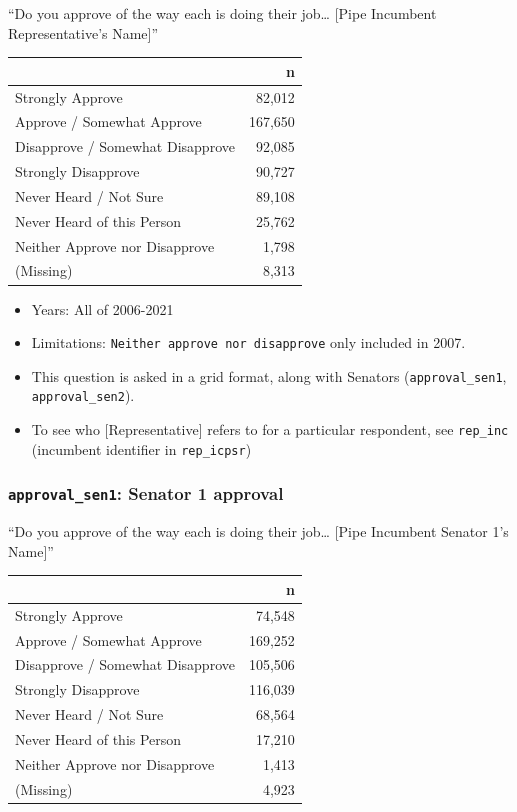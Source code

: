 \documentclass[10pt,article,oneside]{memoir}
\theoremstyle{definition}
\begin{document}
``Do you approve of the way each is doing their job\ldots{} {[}Pipe
Incumbent Representative's Name{]}''

\begin{table}[H]
\centering
\begin{tabular}[t]{lr}
\toprule
 & n\\
\midrule
Strongly Approve & 82,012\\
Approve / Somewhat Approve & 167,650\\
Disapprove / Somewhat Disapprove & 92,085\\
Strongly Disapprove & 90,727\\
Never Heard / Not Sure & 89,108\\
Never Heard of this Person & 25,762\\
Neither Approve nor Disapprove & 1,798\\
(Missing) & 8,313\\
\bottomrule
\end{tabular}
\end{table}

\begin{itemize}
\tightlist
\item
  Years: All of 2006-2021
\item
  Limitations: \texttt{Neither\ approve\ nor\ disapprove} only included
  in 2007.
\item
  This question is asked in a grid format, along with Senators
  (\texttt{approval\_sen1}, \texttt{approval\_sen2}).
\item
  To see who {[}Representative{]} refers to for a particular respondent,
  see \texttt{rep\_inc} (incumbent identifier in \texttt{rep\_icpsr})
\end{itemize}

\hypertarget{approval_sen1-senator-1-approval}{%
\subsubsection{\texorpdfstring{\texttt{approval\_sen1}: Senator 1
approval}{approval\_sen1: Senator 1 approval}}\label{approval_sen1-senator-1-approval}}

``Do you approve of the way each is doing their job\ldots{} {[}Pipe
Incumbent Senator 1's Name{]}''

\begin{table}[H]
\centering
\begin{tabular}[t]{lr}
\toprule
 & n\\
\midrule
Strongly Approve & 74,548\\
Approve / Somewhat Approve & 169,252\\
Disapprove / Somewhat Disapprove & 105,506\\
Strongly Disapprove & 116,039\\
Never Heard / Not Sure & 68,564\\
Never Heard of this Person & 17,210\\
Neither Approve nor Disapprove & 1,413\\
(Missing) & 4,923\\
\bottomrule
\end{tabular}
\end{table}
\end{document}
